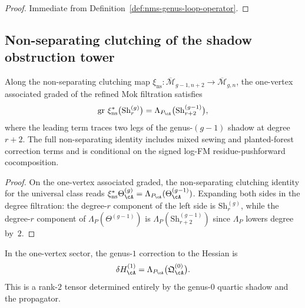 \begin{proof}
Immediate from Definition~\ref{def:nms-genus-loop-operator}.\qedhere
\end{proof}

\subsection{Non-separating clutching of the shadow obstruction tower}
\label{subsec:nms-nonseparating-clutching}

\begin{theorem}
\label{thm:nms-nonseparating-clutching-law}
Along the non-separating clutching map
$\xi_{\mathrm{ns}}\colon \overline{\mathcal M}_{g-1,n+2}\to \overline{\mathcal M}_{g,n}$,
the one-vertex associated graded of the refined Mok filtration satisfies
\begin{equation}
\label{eq:nms-nonseparating-recursion}
\operatorname{gr}\,\xi_{\mathrm{ns}}^*\bigl(\mathrm{Sh}_r^{(g)}\bigr)
=
\Lambda_{P_{\cA}}\bigl(\mathrm{Sh}_{r+2}^{(g-1)}\bigr),
\end{equation}
where the leading term traces two legs of the genus-$(g-1)$ shadow at
degree $r+2$. The full non-separating identity includes mixed sewing
and planted-forest correction terms and is conditional on the signed
log-FM residue-pushforward cocomposition.
\end{theorem}

\begin{proof}
On the one-vertex associated graded, the non-separating clutching
identity for the universal class reads
$\xi_{\mathrm{ns}}^*\Theta_{\cA}^{(g)}
=
\Lambda_{P_{\cA}}(\Theta_{\cA}^{(g-1)})$.
Expanding both sides in the degree filtration: the degree-$r$ component of the left side is $\mathrm{Sh}_r^{(g)}$, while the degree-$r$ component of $\Lambda_P(\Theta^{(g-1)})$ is $\Lambda_P(\mathrm{Sh}_{r+2}^{(g-1)})$ since $\Lambda_P$ lowers degree by~$2$.\qedhere
\end{proof}

\begin{corollary}
\label{cor:nms-genus-one-hessian-correction}
In the one-vertex sector, the genus-$1$ correction to the Hessian is
\begin{equation}
\label{eq:nms-genus-one-hessian-correction}
\delta H_{\cA}^{(1)}
=
\Lambda_{P_{\cA}}\bigl(\mathfrak Q_{\cA}^{(0)}\bigr).
\end{equation}
This is a rank-$2$ tensor determined entirely by the genus-$0$ quartic shadow and the propagator.
\end{corollary}

